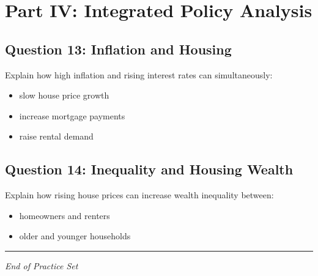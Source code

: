 \documentclass[11pt]{article}
\begin{document}
\section*{Part IV: Integrated Policy Analysis}

\subsection*{Question 13: Inflation and Housing}

Explain how high inflation and rising interest rates can simultaneously:

\begin{itemize}
\item slow house price growth
\item increase mortgage payments
\item raise rental demand
\end{itemize}


\subsection*{Question 14: Inequality and Housing Wealth}

Explain how rising house prices can increase wealth inequality between:

\begin{itemize}
\item homeowners and renters
\item older and younger households
\end{itemize}



\vspace{1em}
\hrule
\vspace{0.5em}
\textit{End of Practice Set}
\end{document}
